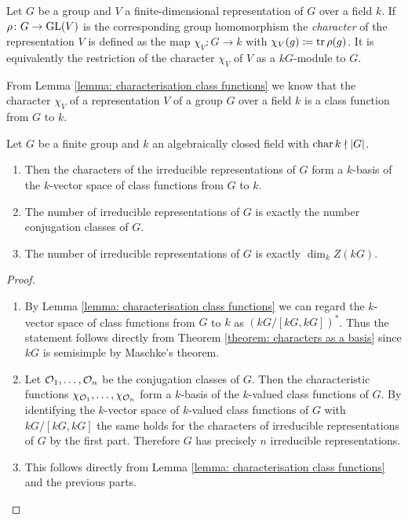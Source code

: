\begin{definition}
  Let $G$ be a group and $V$ a finite-dimensional representation of $G$ over a field $k$. If $\rho \colon G \to \operatorname{GL}(V)$ is the corresponding group homomorphism the \emph{character} of the representation $V$ is defined as the map $\chi_V \colon G \to k$ with $\chi_V(g) \coloneqq \operatorname{tr} \rho(g)$. It is equivalently the restriction of the character $\chi_V$ of $V$ as a $kG$-module to $G$.
\end{definition}


From Lemma \ref{lemma: characterisation class functions} we know that the character $\chi_V$ of a representation $V$ of a group $G$ over a field $k$ is a class function from $G$ to $k$.


\begin{proposition} \label{proposition: conjugation classes and irreducible representations}
  Let $G$ be a finite group and $k$ an algebraically closed field with $\operatorname{char} k \nmid |G|$.
  \begin{enumerate}[label=\emph{\alph*)}, leftmargin=*]
    \item
      Then the characters of the irreducible representations of $G$ form a $k$-basis of the $k$-vector space of class functions from $G$ to $k$.
    \item
      The number of irreducible representations of $G$ is exactly the number conjugation classes of $G$.
    \item
      The number of irreducible representations of $G$ is exactly $\dim_k Z(kG)$.
  \end{enumerate}
\end{proposition}
\begin{proof}
  \begin{enumerate}[label=\emph{\alph*)}, leftmargin=*]
    \item
      By Lemma \ref{lemma: characterisation class functions} we can regard the $k$-vector space of class functions from $G$ to $k$ as $(kG/[kG,kG])^*$.
      Thus the statement follows directly from Theorem \ref{theorem: characters as a basis} since $kG$ is semisimple by Maschke’s theorem.
    \item
      Let $\mathcal{O}_1, \dotsc, \mathcal{O}_n$ be the conjugation classes of $G$.
      Then the characteristic functions $\chi_{\mathcal{O}_1}, \dotsc, \chi_{\mathcal{O}_n}$ form a $k$-basis of the $k$-valued class functions of $G$.
      By identifying the $k$-vector space of $k$-valued class functions of $G$ with $kG/[kG,kG]$ the same holds for the characters of irreducible representations of $G$ by the first part.
      Therefore $G$ has precisely $n$ irreducible representations.
    \item
      This follows directly from Lemma \ref{lemma: characterisation class functions} and the previous parts.
  \end{enumerate}
\end{proof}


